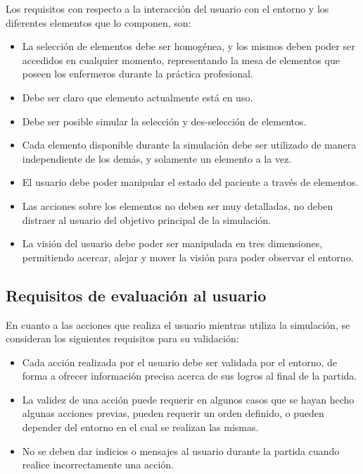 Los requisitos con respecto a la interacción del usuario con el entorno y los diferentes 
elementos que lo componen, son:


\begin{itemize}

\item La selección de elementos debe ser homogénea, y los mismos deben poder ser
    accedidos en cualquier momento, representando la mesa de elementos que
    poseen los enfermeros durante la práctica profesional.

\item Debe ser claro que elemento actualmente está en uso.

\item Debe ser posible simular la selección y des-selección de elementos.

\item Cada elemento disponible durante la simulación debe ser utilizado de
    manera independiente de los demás, y solamente un elemento a la vez.

\item El usuario debe poder manipular el estado del paciente a través de elementos.

\item Las acciones sobre los elementos no deben ser muy detalladas, no deben
    distraer al usuario del objetivo principal de la simulación.

\item La visión del usuario debe poder ser manipulada en tres dimensiones,
    permitiendo acercar, alejar y mover la visión para poder observar el
    entorno.

\end{itemize}

\subsection{Requisitos de evaluación al usuario}

En cuanto a las acciones que realiza el usuario mientras utiliza la simulación,
se consideran los siguientes requisitos para su validación:

\begin{itemize}


\item Cada acción realizada por el usuario debe ser validada por el entorno, de
    forma a ofrecer información precisa acerca de sus logros al final de la
    partida.

\item La validez de una acción puede requerir en algunos casos que se hayan
    hecho algunas acciones previas, pueden requerir un orden definido, o pueden
    depender del entorno en el cual se realizan las mismas.

\item No se deben dar indicios o mensajes al usuario durante la partida cuando
    realice incorrectamente una acción.

\end{itemize}

